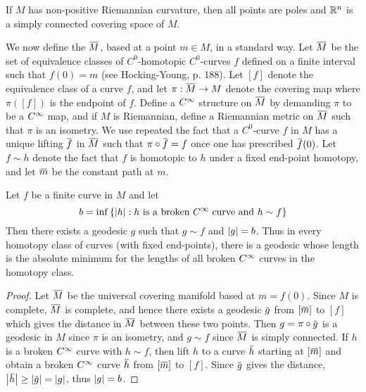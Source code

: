 \documentclass[../main]{subfiles}
\begin{document}
\begin{corollary} \label{cor:ch10.7.2}
If $M$ has non-positive Riemannian curvature, then all points are poles and $\mathbb{R}^n$ is a simply connected covering space of $M$.
\end{corollary}



We now define the  $\xoverline M$, based at a point $m\in M$, in a standard way. Let $\xoverline M$ be the set of equivalence classes of $C^0$-homotopic $C^0$-curves $f$ defined on a finite interval such that $f(0)=m$ (see Hocking-Young, p. 188). Let $[f]$ denote the equivalence class of a curve $f$, and let $\pi:\xoverline{M}\functionMaps M$ denote the covering map where $\pi([f])$ is the endpoint of $f$. Define a $C^\infty$ structure on $\xoverline M$ by demanding $\pi$ to be a $C^\infty$ map, and if $M$ is Riemannian, define a Riemannian metric on $\xoverline M$ such that $\pi$ is an isometry. We use repeated the fact that a $C^0$-curve $f$ in $M$ has a unique lifting $\xoverline f$ in $\xoverline M$ such that $\pi\circ\xoverline f=f$ once one has prescribed $\xoverline f(0)$. Let $f\sim h$ denote the fact that $f$ is homotopic to $h$ under a fixed end-point homotopy, and let $\xoverline m$ be the constant path at $m$.



\begin{theorem} \label{thm:ch10.7.3}
Let $f$ be a finite curve in $M$ and let
\[b = \inf\left\{\left|h\right|: h \text{ is a broken $C^\infty$ curve and }h\sim f\right\}\]
Then there exists a geodesic $g$ such that $g\sim f$ and $\left|g\right|=b$. Thus in every homotopy class of curves (with fixed end-points), there is a geodesic whose length is the absolute minimum for the lengths of all broken $C^\infty$ curves in the homotopy class.
\end{theorem}

\begin{proof}
Let $\xoverline M$ be the universal covering manifold based at $m=f(0)$. Since $M$ is complete, $\xoverline M$ is complete, and hence there exists a geodesic $\xoverline g$ from $[\xoverline m]$ to $[f]$ which gives the distance in $\xoverline M$ between these two points. Then $g=\pi\circ\xoverline g$ is a geodesic in $M$ since $\pi$ is an isometry, and $g\sim f$ since $\xoverline M$ is simply connected. If $h$ is a broken $C^\infty$ curve with $h\sim f$, then lift $h$ to a curve $\xoverline h$ starting at $[\xoverline m]$ and obtain a broken $C^\infty$ curve $\xoverline h$ from $[\xoverline m]$ to $[f]$. Since $\xoverline g$ gives the distance, $\norm{\xoverline h}\ge\norm{\xoverline g}=\norm g$, thus $\left|g\right|=b$.
\end{proof}
\end{document}
